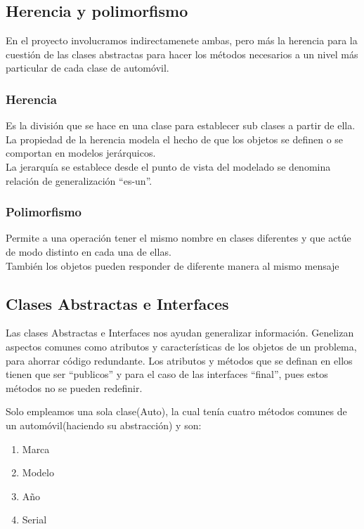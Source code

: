 \documentclass{article}
\begin{document}
\subsection{Herencia y polimorfismo}

En el proyecto involucramos indirectamenete ambas, pero más la herencia para la cuestión de las clases abstractas para hacer los métodos necesarios
a un nivel más particular de cada clase de automóvil.

\subsubsection{Herencia}

Es la división que se hace en una clase para establecer sub clases a partir de ella.\\
La propiedad de la herencia modela el hecho de que los objetos se definen o se comportan en modelos jerárquicos.\\
La jerarquía se establece desde el punto de vista del modelado se denomina relación de generalización ``es-un''.

\subsubsection{Polimorfismo}

Permite a una operación tener el mismo nombre en clases diferentes y que actúe de modo distinto en cada una de ellas.\\
También los objetos pueden responder de diferente manera al mismo mensaje

\subsection{Clases Abstractas e Interfaces}

Las clases Abstractas e Interfaces nos ayudan generalizar información. Genelizan aspectos comunes como atributos y características de los objetos de un problema, para ahorrar código redundante. Los atributos y métodos que se definan en ellos tienen que ser ``publicos'' y para el caso de las interfaces ``final'', pues estos métodos no se pueden redefinir.\newline

Solo empleamos una sola clase(Auto), la cual tenía cuatro métodos comunes de un automóvil(haciendo su abstracción) y son:
\begin{enumerate}
\item Marca
\item Modelo
\item Año
\item Serial
\end{enumerate}
\end{document}
